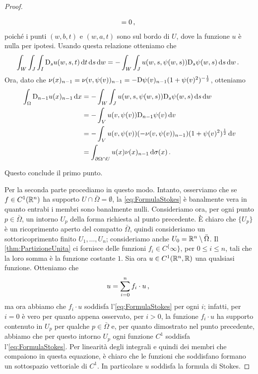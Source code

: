 \begin{proof}
\begin{description}
\begin{align*}
				= 0\, \text{, }
			\end{align*}
			poiché i punti $(w,b,t)$ e $(w,a,t)$ sono sul bordo di $U$, dove la funzione $u$ è nulla per ipotesi. Usando questa relazione
			otteniamo che
			\[
				\int_W\int_J\int_I\mathrm D_s u(w,s,t) \,\mathrm d t \,\mathrm d s \,\mathrm d w =-\int_W \int_J u(w,s,\psi(w,s))\mathrm D_s \psi (w,s)\,\mathrm d s\,\mathrm d w\, \text{. }
			\]
			Ora, dato che $\nu(x)_{n-1}=\nu(v,\psi(v))_{n-1}=-\mathrm D\psi(v)_{n-1}(1+\psi(v)^2)^{-\frac{1}{2}}$, otteniamo
			\begin{align*}
				\int_{\Omega} \mathrm D_{n-1} u(x)_{n-1} \,\mathrm d x & = -\int_W \int_J u(w,s,\psi(w,s))\mathrm D_s \psi (w,s) \,\mathrm d s \,\mathrm d w\\
				& = -\int_V u(v,\psi(v))\mathrm D_{n-1} \psi(v) \,\mathrm d v\\
				& = -\int_V u(v,\psi(v))(-\nu(v,\psi(v))_{n-1})(1+\psi(v)^2)^{\frac{1}{2}} \,\mathrm d v\\
				& = \int_{\partial \Omega \cap U} u(x)\nu(x)_{n-1} \,\mathrm d \sigma(x)\, \text{. }
			\end{align*}
	\end{description}
	Questo conclude il primo punto.
	
	Per la seconda parte procediamo in questo modo. Intanto, osserviamo che se $f\in C^1(\mathbb R^n)$ ha supporto $U\cap \bar\Omega = \emptyset$, la
	\cref{eq:FormulaStokes} è banalmente vera in quanto entrabi i membri sono banalmente nulli.
	Consideriamo ora, per ogni punto $p\in \bar\Omega$, un intorno $U_p$ della forma richiesta al punto precedente. È chiaro che $\{U_p\}$ è un
	ricoprimento aperto del compatto $\bar \Omega$, quindi consideriamo un sottoricoprimento finito $U_1,\dots,U_n$; consideriamo anche
	$U_0=\mathbb R^n \setminus \bar\Omega$. Il \cref{thm:PartizioneUnita} ci fornisce delle funzioni $f_i\in C^\{\infty\}$, per $0\leq i \leq n$,
	tali che la loro somma è la funzione costante $1$.
	Sia ora $u\in C^1(\mathbb R^n,\mathbb R)$ una qualsiasi funzione. Otteniamo che
	\[
		u = \sum_{i=0}^n f_i\cdot u\, \text{, }
	\]
	ma ora abbiamo che $f_i \cdot u$ soddisfa l'\cref{eq:FormulaStokes} per ogni $i$; infatti, per $i=0$ è vero per quanto appena osservato,
	per $i>0$, la funzione $f_i \cdot u$ ha supporto contenuto in $U_p$ per qualche $p\in \bar\Omega$ e, per quanto dimostrato nel punto precedente,
	abbiamo che per questo intorno $U_p$ ogni funzione $C^1$ soddisfa l'\cref{eq:FormulaStokes}. Per linearità degli integrali e quindi dei membri
	che compaiono in questa equazione, è chiaro che le funzioni che soddisfano formano un sottospazio vettoriale di $C^1$. In particolare $u$
	soddisfa la formula di Stokes.
\end{proof}

